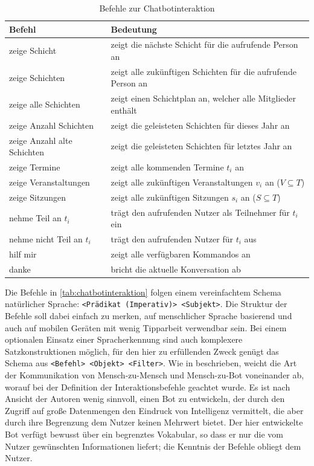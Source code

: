\begin{table}[H]
\centering
\begin{tabular}{l|l}
  \textbf{Befehl }& \textbf{Bedeutung }\\
 \hline
 zeige Schicht & zeigt die nächste Schicht für die aufrufende Person an \\
 zeige Schichten & zeigt alle zukünftigen Schichten für die aufrufende Person an \\
 zeige alle Schichten & zeigt einen Schichtplan an, welcher alle Mitglieder enthält \\
 
 zeige Anzahl Schichten & zeigt die geleisteten Schichten für dieses Jahr an \\
 zeige Anzahl alte Schichten & zeigt die geleisteten Schichten für letztes Jahr an \\
 
 zeige Termine & zeigt alle kommenden Termine $t_i$ an \\
 zeige Veranstaltungen & zeigt alle zukünftigen Veranstaltungen $v_i$ an ($V \subseteq T$) \\
 zeige Sitzungen & zeigt alle zukünftigen Sitzungen $s_i$ an ($S \subseteq T$) \\
 
 nehme Teil an $t_i$ & trägt den aufrufenden Nutzer als Teilnehmer für $t_i$ ein \\
 nehme nicht Teil an $t_i$ & trägt den aufrufenden Nutzer für $t_i$ aus\\

 hilf mir & zeigt alle verfügbaren Kommandos an \\
 danke & bricht die aktuelle Konversation ab \\
\end{tabular}
\caption{Befehle zur Chatbotinteraktion}
\label{tab:chatbotinteraktion}
\end{table}


Die Befehle in \autoref{tab:chatbotinteraktion} folgen einem vereinfachtem Schema natürlicher Sprache: \texttt{<Prädikat (Imperativ)> <Subjekt>}. Die Struktur der Befehle soll dabei einfach zu merken, auf menschlicher Sprache basierend und auch auf mobilen Geräten mit wenig Tipparbeit verwendbar sein. Bei einem optionalen Einsatz einer Spracherkennung sind auch komplexere Satzkonstruktionen möglich, für den hier zu erfüllenden Zweck genügt das Schema aus \texttt{<Befehl> <Objekt> <Filter>}. Wie in \cite{ZueConversationalinterfacesadvances2000} beschrieben, weicht die Art der Kommunikation von Mensch-zu-Mensch und Mensch-zu-Bot voneinander ab, worauf bei der Definition der Interaktionsbefehle geachtet wurde. Es ist nach Ansicht der Autoren wenig sinnvoll, einen Bot zu entwickeln, der durch den Zugriff auf große Datenmengen den Eindruck von Intelligenz vermittelt, die aber durch ihre Begrenzung dem Nutzer keinen Mehrwert bietet. Der hier entwickelte Bot verfügt bewusst über ein begrenztes Vokabular, so dass er nur die vom Nutzer gewünschten Informationen liefert; die Kenntnis der Befehle obliegt dem Nutzer.

